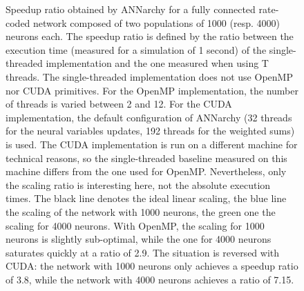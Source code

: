 \documentclass[
  11pt,
  a4paper,
]{scrbook}
\begin{document}
\begin{figure}


\caption{\label{fig-fini:perf-rate}Speedup ratio obtained by ANNarchy
for a fully connected rate-coded network composed of two populations of
1000 (resp. 4000) neurons each. The speedup ratio is defined by the
ratio between the execution time (measured for a simulation of 1 second)
of the single-threaded implementation and the one measured when using T
threads. The single-threaded implementation does not use OpenMP nor CUDA
primitives. For the OpenMP implementation, the number of threads is
varied between 2 and 12. For the CUDA implementation, the default
configuration of ANNarchy (32 threads for the neural variables updates,
192 threads for the weighted sums) is used. The CUDA implementation is
run on a different machine for technical reasons, so the single-threaded
baseline measured on this machine differs from the one used for OpenMP.
Nevertheless, only the scaling ratio is interesting here, not the
absolute execution times. The black line denotes the ideal linear
scaling, the blue line the scaling of the network with 1000 neurons, the
green one the scaling for 4000 neurons. With OpenMP, the scaling for
1000 neurons is slightly sub-optimal, while the one for 4000 neurons
saturates quickly at a ratio of 2.9. The situation is reversed with
CUDA: the network with 1000 neurons only achieves a speedup ratio of
3.8, while the network with 4000 neurons achieves a ratio of 7.15.}

\end{figure}%
\end{document}
